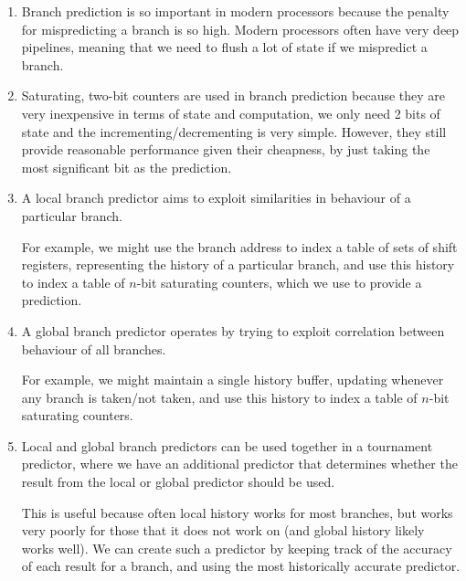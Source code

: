 


\begin{enumerate}[label=(\alph*)]

  \item
    Branch prediction is so important in modern processors because the penalty for mispredicting a branch is so high. Modern processors often have very deep pipelines, meaning that we need to flush a lot of state if we mispredict a branch.

  \item
    Saturating, two-bit counters are used in branch prediction because they are very inexpensive in terms of state and computation, we only need 2 bits of state and the incrementing/decrementing is very simple. However, they still provide reasonable performance given their cheapness, by just taking the most significant bit as the prediction.

  \item
    A local branch predictor aims to exploit similarities in behaviour of a particular branch.

    For example, we might use the branch address to index a table of sets of shift registers, representing the history of a particular branch, and use this history to index a table of $n$-bit saturating counters, which we use to provide a prediction.

  \item
    A global branch predictor operates by trying to exploit correlation between behaviour of all branches.

    For example, we might maintain a single history buffer, updating whenever any branch is taken/not taken, and use this history to index a table of $n$-bit saturating counters.

  \item
    Local and global branch predictors can be used together in a tournament predictor, where we have an additional predictor that determines whether the result from the local or global predictor should be used.

    This is useful because often local history works for most branches, but works very poorly for those that it does not work on (and global history likely works well). We can create such a predictor by keeping track of the accuracy of each result for a branch, and using the most historically accurate predictor.
    
\end{enumerate}

